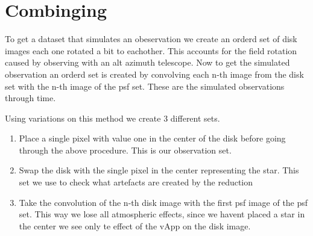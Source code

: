 
\section{Combinging}

To get a dataset that simulates an obeservation we create an orderd set of disk images each one rotated a bit to eachother. This accounts for the field rotation caused by observing with an alt azimuth telescope. Now to get the simulated observation an orderd set is created by convolving each n-th image from the disk set with the n-th image of the psf set. These are the simulated observations through time. 

Using variations on this method we create 3 different sets.

\begin{enumerate}
\item Place a single pixel with value one in the center of the disk before going through the above procedure. This is our observation set.
\item Swap the disk with the single pixel in the center representing the star. This set we use to check what artefacts are created by the reduction 
\item Take the convolution of the n-th disk image with the first psf image of the psf set. This way we lose all atmospheric effects, since we havent placed a star in the center we see only te effect of the vApp on the disk image. 
\end{enumerate}
